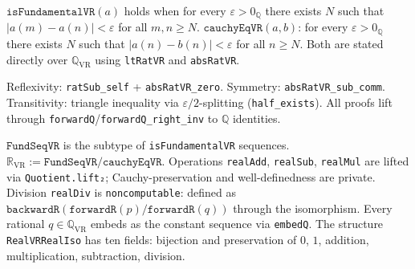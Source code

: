 \begin{definition}
\label{def:isFundamentalVR}
\leanok
{}
$\texttt{isFundamentalVR}(a)$ holds when for every $\varepsilon > 0_{\mathbb{Q}}$
there exists $N$ such that $|a(m) - a(n)| < \varepsilon$ for all $m, n \ge N$.
$\texttt{cauchyEqVR}(a, b)$: for every $\varepsilon > 0_{\mathbb{Q}}$ there exists
$N$ such that $|a(n) - b(n)| < \varepsilon$ for all $n \ge N$.
Both are stated directly over $\mathbb{Q}_{\mathrm{VR}}$ using \texttt{ltRatVR}
and \texttt{absRatVR}.
\end{definition}

\begin{theorem}
\label{thm:cauchyEq_equiv}
\leanok
{}
Reflexivity: \texttt{ratSub\_self} + \texttt{absRatVR\_zero}.  Symmetry:
\texttt{absRatVR\_sub\_comm}.  Transitivity: triangle inequality via
$\varepsilon/2$-splitting (\texttt{half\_exists}).
All proofs lift through \texttt{forwardQ}/\texttt{forwardQ\_right\_inv}
to $\mathbb{Q}$ identities.
\end{theorem}

\begin{definition}
\label{def:RealVR}
\leanok
{}
$\texttt{FundSeqVR}$ is the subtype of \texttt{isFundamentalVR} sequences.
$\mathbb{R}_{\mathrm{VR}} := \texttt{FundSeqVR} / \texttt{cauchyEqVR}$.
Operations \texttt{realAdd}, \texttt{realSub}, \texttt{realMul} are lifted
via \texttt{Quotient.lift₂}; Cauchy-preservation and well-definedness are
private.  Division \texttt{realDiv} is \texttt{noncomputable}: defined as
$\texttt{backwardR}(\texttt{forwardR}(p) / \texttt{forwardR}(q))$ through
the isomorphism.  Every rational $q \in \mathbb{Q}_{\mathrm{VR}}$ embeds
as the constant sequence via \texttt{embedQ}.
The structure \texttt{RealVRRealIso} has ten fields: bijection and preservation
of $0$, $1$, addition, multiplication, subtraction, division.
\end{definition}

